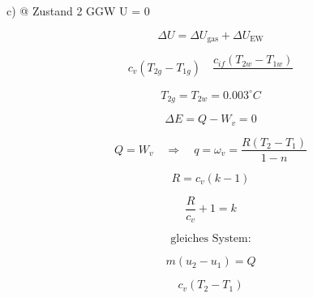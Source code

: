 c) @ Zustand 2 GGW \quad \longrightarrow \quad \Delta U = 0

\[
\Delta U = \Delta U_{\text{gas}} + \Delta U_{\text{EW}}
\]

\[
c_v \left( T_{2g} - T_{1g} \right) \quad \frac{c_{if} \left( T_{2w} - T_{1w} \right)}{}
\]

\[
T_{2g} = T_{2w} = 0.003^\circ C
\]

\[
\Delta E = Q - W_v = 0
\]

\[
Q = W_v \quad \Rightarrow \quad q = \omega_v = \frac{R \left( T_2 - T_1 \right)}{1 - n}
\]

\[
R = c_v (k - 1)
\]

\[
\frac{R}{c_v} + 1 = k
\]

\[
\text{gleiches System:}
\]

\[
m (u_2 - u_1) = Q
\]

\[
c_v (T_2 - T_1)
\]